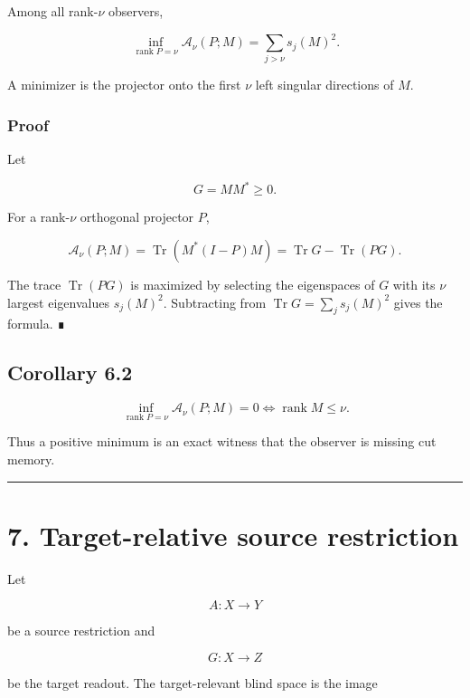 Among all rank-\(\nu\) observers,

\[
\boxed{
\inf_{\operatorname{rank}P=\nu}
\mathcal A_\nu(P;M)
=
\sum_{j>\nu}s_j(M)^2.
}
\]

A minimizer is the projector onto the first \(\nu\) left singular directions
of \(M\).

\hypertarget{proof-2}{%
\subsubsection{Proof}\label{proof-2}}

Let

\[
G=MM^*\ge0.
\]

For a rank-\(\nu\) orthogonal projector \(P\),

\[
\mathcal A_\nu(P;M)
=
\operatorname{Tr}(M^*(I-P)M)
=
\operatorname{Tr}G-\operatorname{Tr}(PG).
\]

The trace \(\operatorname{Tr}(PG)\) is maximized by selecting the eigenspaces of
\(G\) with its \(\nu\) largest eigenvalues \(s_j(M)^2\). Subtracting from
\(\operatorname{Tr}G=\sum_j s_j(M)^2\) gives the formula. ∎

\hypertarget{corollary-6.2}{%
\subsection{Corollary 6.2}\label{corollary-6.2}}

\[
\inf_{\operatorname{rank}P=\nu}
\mathcal A_\nu(P;M)=0
\iff
\operatorname{rank}M\le\nu.
\]

Thus a positive minimum is an exact witness that the observer is missing cut
memory.

\begin{center}\rule{0.5\linewidth}{0.5pt}\end{center}

\hypertarget{target-relative-source-restriction}{%
\section{7. Target-relative source restriction}\label{target-relative-source-restriction}}

Let

\[
A:X\longrightarrow Y
\]

be a source restriction and

\[
G:X\longrightarrow Z
\]

be the target readout. The target-relevant blind space is the image

